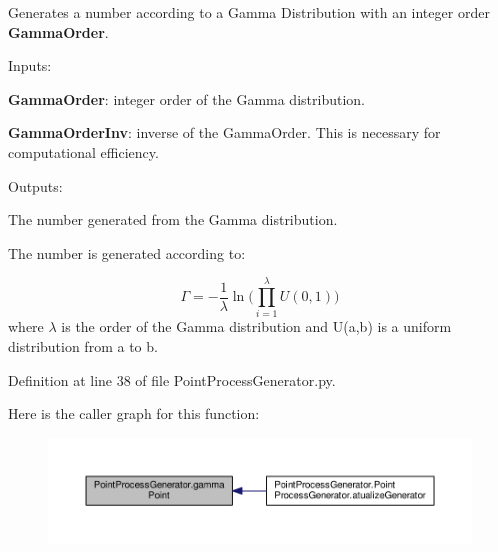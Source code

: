 Generates a number according to a Gamma Distribution with an integer order {\bfseries Gamma\+Order}. 


\begin{DoxyItemize}
\item Inputs\+:
\begin{DoxyItemize}
\item {\bfseries Gamma\+Order}\+: integer order of the Gamma distribution.
\item {\bfseries Gamma\+Order\+Inv}\+: inverse of the Gamma\+Order. This is necessary for computational efficiency.
\end{DoxyItemize}
\item Outputs\+:
\begin{DoxyItemize}
\item The number generated from the Gamma distribution.
\end{DoxyItemize}
\end{DoxyItemize}

The number is generated according to\+:

\begin{equation} \Gamma = -\frac{1}{\lambda}\ln(\limits\prod_{i=1}^{\lambda} U(0,1)) \end{equation} where $\lambda$ is the order of the Gamma distribution and U(a,b) is a uniform distribution from a to b. 

Definition at line 38 of file Point\+Process\+Generator.\+py.



Here is the caller graph for this function\+:\nopagebreak
\begin{figure}[H]
\begin{center}
\leavevmode
\includegraphics[width=350pt]{namespace_point_process_generator_a01488b4f69653d1fb9653b7a8d37744e_icgraph}
\end{center}
\end{figure}


